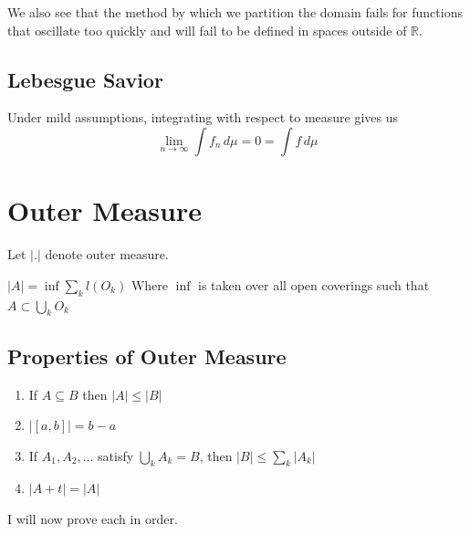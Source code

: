 \documentclass[12pt]{article}
\theoremstyle{plain}
\theoremstyle{definition}
\theoremstyle{definition}
\theoremstyle{remark}
\begin{document}
We also see that the method by which we partition the domain fails for functions
that oscillate too quickly and will fail to be defined in spaces outside of $\mathbb{R}$.


\subsection{Lebesgue Savior}

Under mild assumptions, integrating with respect to measure gives us
\begin{equation}
    \lim_{n \to \infty} \int f_n \, d\mu = 0 = \int f \, d\mu
\end{equation}





\section{Outer Measure}
Let $|.|$ denote outer measure.

\begin{definition}
    $|A| = \inf \sum_k l(O_k)$ Where $\inf$ is taken over all open coverings such that
    $A \subset \bigcup_k O_k$
\end{definition}

\subsection{Properties of Outer Measure}


\begin{theorem}
\mbox{}
\begin{enumerate}
  \item If $A \subseteq B$ then $|A| \leq |B|$
  \item $|[a,b]| = b - a$
  \item If $A_1, A_2, \ldots$ satisfy $\bigcup_k A_k = B$, then $|B| \leq \sum_k |A_k|$
  \item $|A + t| = |A|$
\end{enumerate}
\end{theorem}

I will now prove each in order.
\end{document}
